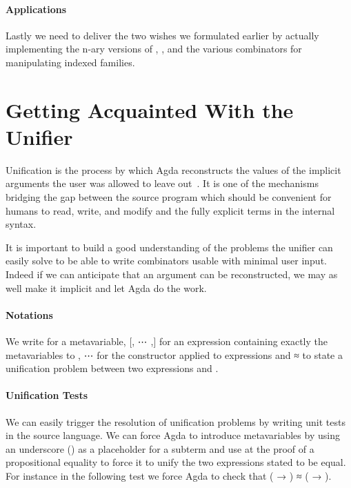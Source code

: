 \paragraph{Applications} Lastly we need to deliver the two wishes we
formulated earlier by actually implementing the n-ary versions of ,
, and the various combinators for manipulating indexed families.

\section{Getting Acquainted With the Unifier}\label{sec:unifier}

Unification is the process by which Agda reconstructs the values of the
implicit arguments the user was allowed to leave
out~\cite{DBLP:phd/basesearch/Cockx17,DBLP:journals/jfp/CockxD18}. It is one of the
mechanisms bridging the gap between the source program which should be
convenient for humans to read, write, and modify and the fully explicit
terms in the internal syntax.

It is important to build a good understanding of the problems the unifier
can easily solve to be able to write combinators usable with minimal user
input. Indeed if we can anticipate that an argument can be reconstructed,
we may as well make it implicit and let Agda do the work.

\paragraph{Notations} We write  for a
metavariable, [, ⋯ ,] for an expression 
containing exactly the metavariables  to ,
  ⋯  for the constructor  applied to 
expressions and { ≈ } to state a unification problem
between two expressions  and .

\paragraph{Unification Tests} We can easily trigger the resolution of
unification problems by writing unit tests in the source language. We can
force Agda to introduce metavariables by using an underscore (\AF{\_}) as a
placeholder for a subterm and use  at the proof of a propositional
equality to force it to unify the two expressions stated to be equal. For
instance in the following test we force Agda to check that
{( → ) ≈ ( → )}.

